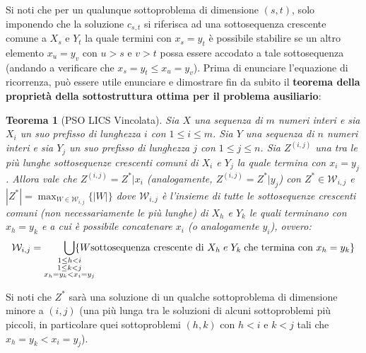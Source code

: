 \documentclass[12pt]{article}
\newtheorem{Teorema}{Teorema}[subsection]
\begin{document}
Si noti che per un qualunque sottoproblema di dimensione $(s,t)$, solo imponendo che la soluzione $c_{s,t}$ si riferisca ad una sottosequenza crescente comune a $X_s$ e $Y_t$ la quale termini con $x_s = y_t$ è possibile stabilire se un altro elemento $x_u = y_v$ con $u>s$ e $v>t$ possa essere
accodato a tale sottosequenza (andando a verificare che $x_s = y_t \leq x_u = y_v$). \newline
Prima di enunciare l'equazione di ricorrenza, può essere utile enunciare e dimostrare fin da subito il \textbf{teorema della proprietà della sottostruttura ottima per il problema ausiliario}:
\begin{Teorema}[PSO LICS Vincolata]
    Sia $X$ una sequenza di $m$ numeri interi e sia $X_i$ un suo prefisso di lunghezza $i$ con $1 \leq i \leq m$. Sia $Y$ una sequenza di $n$ numeri interi e sia $Y_j$ un suo prefisso di lunghezza
    $j$ con $1 \leq j \leq n$. Sia $Z^{(i,j)}$ una tra le più lunghe sottosequenze crescenti comuni di $X_i$ e $Y_j$ la quale termina con $x_i = y_j$. Allora vale che $Z^{(i,j)} = Z^*|x_i$ (analogamente, $Z^{(i,j)} = Z^*|y_j$) con $Z^* \in \mathcal{W}_{i,j}$ e $|Z^*| = \max_{W \in \mathcal{W}_{i,j}}\{|W|\}$ dove $\mathcal{W}_{i,j}$ è
    l'insieme di tutte le sottosequenze crescenti comuni (non necessariamente le più lunghe) di $X_h$ e $Y_k$ le quali terminano con $x_h = y_k$ e a cui è possibile concatenare $x_i$ (o analogamente $y_i$), ovvero:
    $$\mathcal{W}_{i,j} = \smashoperator[r]{\bigcup_{\substack{1 \leq h < i \\ 1 \leq k < j \\ x_h = y_k<x_i = y_j}}}\{W \textrm{sottosequenza crescente di } X_h \; e \; Y_k \; \textrm{che termina con } x_h = y_k\}$$
\end{Teorema}
Si noti che $Z^*$ sarà una soluzione di un qualche sottoproblema di dimensione minore a $(i,j)$ (una più lunga tra le soluzioni di alcuni sottoproblemi più piccoli, in particolare quei sottoproblemi $(h,k)$ con $h<i$ e $k<j$ tali che $x_h=y_k<x_i=y_j$).
\end{document}
